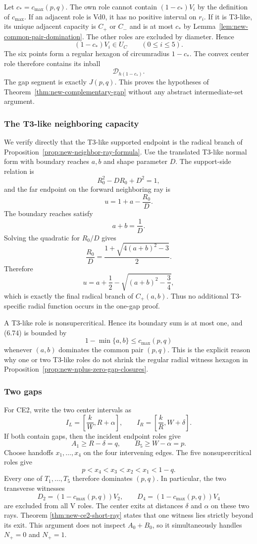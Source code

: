 Let $c_*=c_{\max}(p,q)$.  The own role cannot contain
$(1-c_*)V_i$ by the definition of $c_{\max}$.  If an adjacent role is Vd0,
it has no positive interval on $r_i$.  If it is T3-like, its unique adjacent
capacity is $C_+$ or $C_-$ and is at most $c_*$ by
Lemma~\ref{lem:new-common-pair-domination}.  The other roles are excluded by
diameter.  Hence
\[
 (1-c_*)V_i\in U_C
 \qquad(0\le i\le5).
 \tag{6.73}
\]
The six points form a regular hexagon of circumradius $1-c_*$.  The convex
center role therefore contains its inball
\[
 \mathcal D_{h(1-c_*)}.
\]
The gap segment is exactly $J(p,q)$.  This proves the hypotheses of
Theorem~\ref{thm:new-complementary-gap} without any abstract intermediate-set
argument.

\subsubsection{The T3-like neighboring capacity}

We verify directly that the T3-like supported endpoint is the radical branch
of Proposition~\ref{prop:new-neighbor-ray-formula}.  Use the translated
T3-like normal form with boundary reaches $a,b$ and shape parameter $D$.
The support-side relation is
\[
 R_0^2-DR_0+D^2=1,
\]
and the far endpoint on the forward neighboring ray is
\[
 u=1+a-\frac{R_0}{D}.
\]
The boundary reaches satisfy
\[
 a+b=\frac1D.
\]
Solving the quadratic for $R_0/D$ gives
\[
 \frac{R_0}{D}
 =\frac{1+\sqrt{4(a+b)^2-3}}2.
\]
Therefore
\[
 \boxed{
 u=a+\frac12-\sqrt{(a+b)^2-\frac34},
 }
 \tag{6.74}
\]
which is exactly the final radical branch of $C_+(a,b)$.  Thus no additional
T3-specific radial function occurs in the one-gap proof.

A T3-like role is nonsupercritical.  Hence its boundary sum is at most one,
and (6.74) is bounded by
\[
1-\min\{a,b\}\le c_{\max}(p,q)
\]
whenever $(a,b)$ dominates the common pair $(p,q)$.  This is the explicit
reason why one or two T3-like roles do not shrink the regular radial witness
hexagon in Proposition~\ref{prop:new-nplus-zero-gap-closures}.

\subsubsection{Two gaps}

For CE2, write the two center intervals as
\[
 I_L=\left[\frac{k}{W},R+\alpha\right],
 \qquad
 I_R=\left[\frac{k}{R},W+\delta\right].
\]
If both contain gaps, then the incident endpoint roles give
\[
 A_1\ge R-\delta=q,
 \qquad
 B_5\ge W-\alpha=p.
\]
Choose handoffs $x_1,\ldots,x_4$ on the four intervening edges.  The five
nonsupercritical roles give
\[
 p<x_4<x_3<x_2<x_1<1-q.
 \tag{6.75}
\]
Every one of $T_1,\ldots,T_5$ therefore dominates $(p,q)$.  In particular,
the two transverse witnesses
\[
 D_2=(1-c_{\max}(p,q))V_2,
 \qquad
 D_4=(1-c_{\max}(p,q))V_4
\]
are excluded from all V roles.  The center exits at distances
$\delta$ and $\alpha$ on these two rays.  Theorem
\ref{thm:new-ce2-short-ray} states that one witness lies strictly beyond its
exit.  This argument does not inspect $A_0+B_0$, so it simultaneously handles
$N_+=0$ and $N_+=1$.

